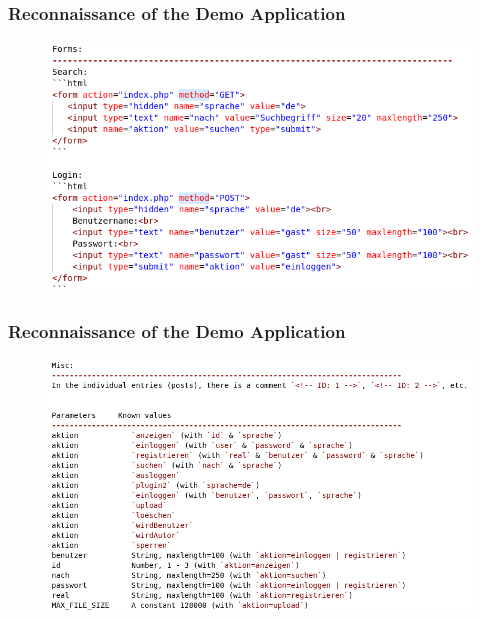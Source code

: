 \documentclass[aspectratio=169]{beamer}
\begin{document}
\begin{frame}
    \frametitle{Reconnaissance of the Demo Application}
    \begin{figure}
        \centering
        \includegraphics[scale=.4]{img/01-recon/recon-forms.png}        
    \end{figure}
\end{frame}

\begin{frame}
    \frametitle{Reconnaissance of the Demo Application}
    \begin{figure}
        \centering
        \includegraphics[scale=.4]{img/01-recon/recon-misc-and-parameters.png}        
    \end{figure}
\end{frame}
\end{document}

